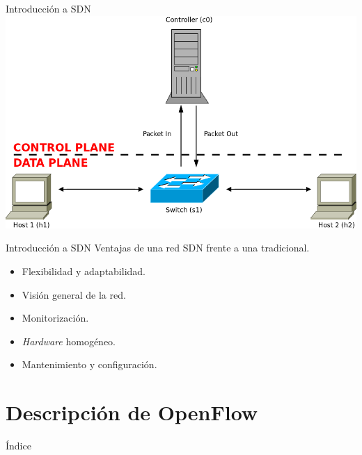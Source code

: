 \documentclass{beamer}
\begin{document}
\begin{frame}{Introducción a SDN}
    \includegraphics[scale=0.33]{SDN.png}
\end{frame}

\begin{frame}{Introducción a SDN}
    Ventajas de una red SDN frente a una tradicional.\vspace{10pt}
    \begin{itemize}
        \item Flexibilidad y adaptabilidad.
        \item Visión general de la red.
        \item Monitorización.
        \item \textit{Hardware} homogéneo.
        \item Mantenimiento y configuración.
    \end{itemize}
\end{frame}

\section{Descripción de OpenFlow}
\begin{frame}{Índice}
    \begin{columns}[t]
        \begin{column}{1.7in}
            \tableofcontents[currentsection, hideallsubsections, sections={1-4}]
        \end{column}
        \begin{column}{1.7in}
            \tableofcontents[currentsection, hideallsubsections, sections={5-7}]
        \end{column}
    \end{columns}
\end{frame}
\end{document}
